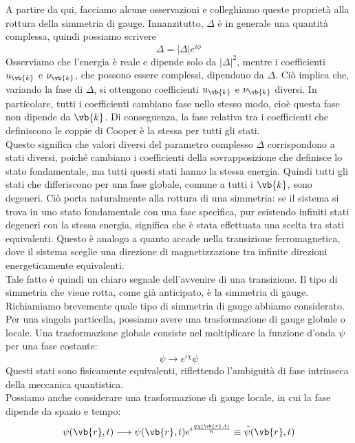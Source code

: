 A partire da qui, facciamo alcune osservazioni e colleghiamo queste proprietà alla rottura della simmetria di gauge. Innanzitutto, $\Delta$ è in generale una quantità complessa, quindi possiamo scrivere
\begin{equation*}
   \Delta = |\Delta| e^{i\phi}
\end{equation*}
Osserviamo che l'energia è reale e dipende solo da $|\Delta|^2$, mentre i coefficienti $u_{\vb{k}}$ e $\nu_{\vb{k}}$, che possono essere complessi, dipendono da $\Delta$. Ciò implica che, variando la fase di $\Delta$, si ottengono coefficienti $u_{\vb{k}}$ e $\nu_{\vb{k}}$ diversi. In particolare, tutti i coefficienti cambiano fase nello stesso modo, cioè questa fase non dipende da $\vb{k}$. Di conseguenza, la fase relativa tra i coefficienti che definiscono le coppie di Cooper è la stessa per tutti gli stati.\\
Questo significa che valori diversi del parametro complesso $\Delta$ corrispondono a stati diversi, poiché cambiano i coefficienti della sovrapposizione che definisce lo stato fondamentale, ma tutti questi stati hanno la stessa energia. Quindi tutti gli stati che differiscono per una fase globale, comune a tutti i $\vb{k}$, sono degeneri. Ciò porta naturalmente alla rottura di una simmetria: se il sistema si trova in uno stato fondamentale con una fase specifica, pur esistendo infiniti stati degeneri con la stessa energia, significa che è stata effettuata una scelta tra stati equivalenti. Questo è analogo a quanto accade nella transizione ferromagnetica, dove il sistema sceglie una direzione di magnetizzazione tra infinite direzioni energeticamente equivalenti.\\
Tale fatto è quindi un chiaro segnale dell'avvenire di una transizione. Il tipo di simmetria che viene rotta, come già anticipato, è la simmetria di gauge.\\
Richiamiamo brevemente quale tipo di simmetria di gauge abbiamo considerato. Per una singola particella, possiamo avere una trasformazione di gauge globale o locale. Una trasformazione globale consiste nel moltiplicare la funzione d'onda $\psi$ per una fase costante:
\begin{equation*}
   \psi \rightarrow e^{i\chi} \psi
\end{equation*}
Questi stati sono fisicamente equivalenti, riflettendo l'ambiguità di fase intrinseca della meccanica quantistica.\\
Possiamo anche considerare una trasformazione di gauge locale, in cui la fase dipende da spazio e tempo:
\begin{equation*}
   \psi(\vb{r},t)
   \longrightarrow
   \psi(\vb{r},t) e^{i \frac{q \chi(\vb{r},t)}{\hbar}}
   \equiv \tilde{\psi}(\vb{r},t)
\end{equation*}
